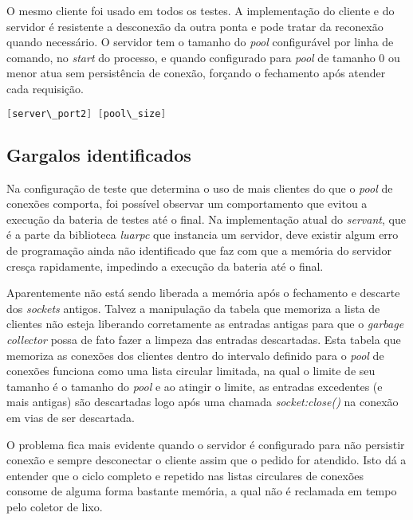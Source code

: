 \documentclass[11pt]{article}
\begin{document}
O mesmo cliente foi usado em todos os testes. A implementação do cliente e do
servidor é resistente a desconexão da outra ponta e pode tratar da reconexão
quando necessário. O servidor tem o tamanho do \textit{pool} configurável por
linha de comando, no \textit{start} do processo, e quando configurado para
\textit{pool} de tamanho 0 ou menor atua sem persistência de conexão, forçando o
fechamento após atender cada requisição.

\begin{lstlisting}[label={commandline},language=C,caption=Linha de comando
$ ./rpc\_server.lua
Usage: ./rpc\_server.lua <interface\_file> [server\_port1] [server\_port2] [pool\_size]
\end{lstlisting}

\subsection{Gargalos identificados}\label{subsec:bottle}

Na configuração de teste que determina o uso de mais clientes do que o
\textit{pool} de conexões comporta, foi possível observar um comportamento que
evitou a execução da bateria de testes até o final. Na implementação atual do
\textit{servant}, que é a parte da biblioteca \textit{luarpc} que instancia
um servidor, deve existir algum erro de programação ainda não identificado que
faz com que a memória do servidor cresça rapidamente, impedindo a execução da
bateria até o final.

Aparentemente não está sendo liberada a memória após o
fechamento e descarte dos \textit{sockets} antigos. Talvez a manipulação da
tabela que memoriza a lista de clientes não esteja liberando corretamente as
entradas antigas para que o \textit{garbage collector} possa de fato fazer a
limpeza das entradas descartadas. Esta tabela que memoriza as conexões dos
clientes dentro do intervalo definido para o \textit{pool} de conexões funciona
como uma lista circular limitada, na qual o limite de seu tamanho é o tamanho do
\textit{pool} e ao atingir o limite, as entradas excedentes (e mais antigas) são
descartadas logo após uma chamada \textit{socket:close()} na conexão em vias de
ser descartada.

O problema fica mais evidente quando o servidor é configurado para não persistir
conexão e sempre desconectar o cliente assim que o pedido for atendido. Isto dá
a entender que o ciclo completo e repetido nas listas circulares de conexões
consome de alguma forma bastante memória, a qual não é reclamada em tempo pelo
coletor de lixo.
\end{document}
